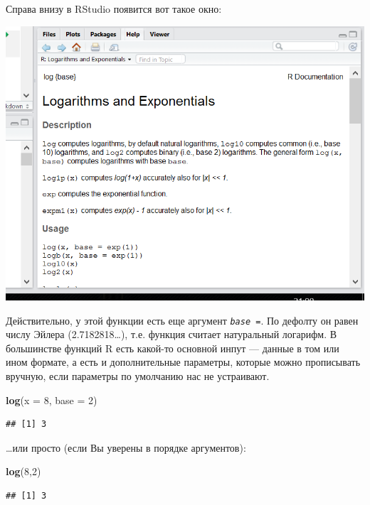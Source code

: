 \documentclass[]{book}
\newenvironment{Shaded}{\begin{snugshade}}{\end{snugshade}}
\newcommand{\DataTypeTok}[1]{\textcolor[rgb]{0.13,0.29,0.53}{#1}}
\newcommand{\DecValTok}[1]{\textcolor[rgb]{0.00,0.00,0.81}{#1}}
\newcommand{\KeywordTok}[1]{\textcolor[rgb]{0.13,0.29,0.53}{\textbf{#1}}}
\newcommand{\NormalTok}[1]{#1}
\begin{document}
Справа внизу в RStudio появится вот такое окно:

\includegraphics{images/help.png}

Действительно, у этой функции есть еще аргумент \emph{\texttt{base\ =}}. По дефолту он равен числу Эйлера (2.7182818\ldots), т.е. функция считает натуральный логарифм.
В большинстве функций R есть какой-то основной инпут --- данные в том или ином формате, а есть и дополнительные параметры, которые можно прописывать вручную, если параметры по умолчанию нас не устраивают.

\begin{Shaded}
\begin{Highlighting}[]
\KeywordTok{log}\NormalTok{(}\DataTypeTok{x =} \DecValTok{8}\NormalTok{, }\DataTypeTok{base =} \DecValTok{2}\NormalTok{)}
\end{Highlighting}
\end{Shaded}

\begin{verbatim}
## [1] 3
\end{verbatim}

\ldots или просто (если Вы уверены в порядке аргументов):

\begin{Shaded}
\begin{Highlighting}[]
\KeywordTok{log}\NormalTok{(}\DecValTok{8}\NormalTok{,}\DecValTok{2}\NormalTok{)}
\end{Highlighting}
\end{Shaded}

\begin{verbatim}
## [1] 3
\end{verbatim}
\end{document}
